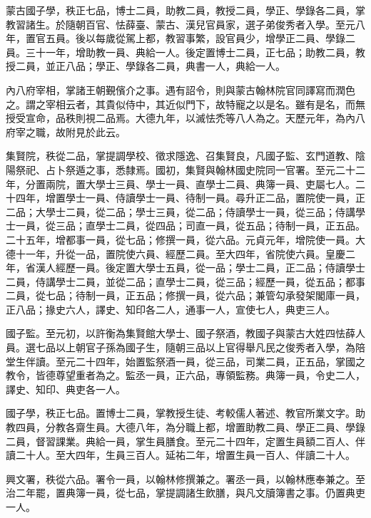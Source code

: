 \begin{pinyinscope}
 蒙古國子學，秩正七品，博士二員，助教二員，教授二員，學正、學錄各二員，掌教習諸生。於隨朝百官、怯薛臺、蒙古、漢兒官員家，選子弟俊秀者入學。至元八年，置官五員。後以每歲從駕上都，教習事繁，設官員少，增學正二員、學錄二員。三十一年，增助教一員、典給一人。後定置博士二員，正七品；助教二員，教授二員，並正八品；學正、學錄各二員，典書一人，典給一人。



 內八府宰相，掌諸王朝覲儐介之事。遇有詔令，則與蒙古翰林院官同譯寫而潤色之。謂之宰相云者，其貴似侍中，其近似門下，故特寵之以是名。雖有是名，而無授受宣命，品秩則視二品焉。大德九年，以滅怯禿等八人為之。天歷元年，為內八府宰之職，故附見於此云。



 集賢院，秩從二品，掌提調學校、徵求隱逸、召集賢良，凡國子監、玄門道教、陰陽祭祀、占卜祭遁之事，悉隸焉。國初，集賢與翰林國史院同一官署。至元二十二年，分置兩院，置大學士三員、學士一員、直學士二員、典簿一員、吏屬七人。二十四年，增置學士一員、侍讀學士一員、待制一員。尋升正二品，置院使一員，正二品；大學士二員，從二品；學士三員，從二品；侍讀學士一員，從三品；侍講學士一員，從三品；直學士二員，從四品；司直一員，從五品；待制一員，正五品。二十五年，增都事一員，從七品；修撰一員，從六品。元貞元年，增院使一員。大德十一年，升從一品，置院使六員、經歷二員。至大四年，省院使六員。皇慶二年，省漢人經歷一員。後定置大學士五員，從一品；學士二員，正二品；侍讀學士二員，侍講學士二員，並從二品；直學士二員，從三品；經歷一員，從五品；都事二員，從七品；待制一員，正五品；修撰一員，從六品；兼管勾承發架閣庫一員，正八品；掾史六人，譯史、知印各二人，通事一人，宣使七人，典吏三人。



 國子監。至元初，以許衡為集賢館大學士、國子祭酒，教國子與蒙古大姓四怯薛人員。選七品以上朝官子孫為國子生，隨朝三品以上官得舉凡民之俊秀者入學，為陪堂生伴讀。至元二十四年，始置監祭酒一員，從三品，司業二員，正五品，掌國之教令，皆德尊望重者為之。監丞一員，正六品，專領監務。典簿一員，令史二人，譯史、知印、典吏各一人。



 國子學，秩正七品。置博士二員，掌教授生徒、考較儒人著述、教官所業文字。助教四員，分教各齋生員。大德八年，為分職上都，增置助教二員、學正二員、學錄二員，督習課業。典給一員，掌生員膳食。至元二十四年，定置生員額二百人、伴讀二十人。至大四年，生員三百人。延祐二年，增置生員一百人、伴讀二十人。



 興文署，秩從六品。署令一員，以翰林修撰兼之。署丞一員，以翰林應奉兼之。至治二年罷，置典簿一員，從七品，掌提調諸生飲膳，與凡文牘簿書之事。仍置典吏一人。




\end{pinyinscope}
